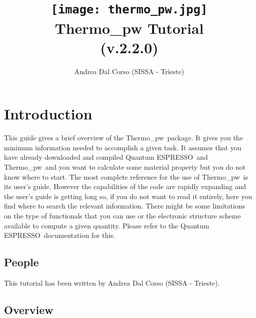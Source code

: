 \documentclass[12pt,a4paper,twoside]{report}
\def\version{2.2.0}
\def\qe{{\sc Quantum ESPRESSO}}
\def\thermo{{\sc Thermo}\_{\sc pw}}
\begin{document}
 

\author{Andrea Dal Corso (SISSA - Trieste)}
\date{}

\title{
  \texttt{[image: thermo\_pw.jpg]} \\
  \vspace{3truecm}
  \Huge \color{dark-blue} {\sc Thermo}\_{\sc pw} Tutorial \\ (v.\version)
}

\maketitle

\newpage

\tableofcontents

\newpage

{\color{dark-blue}\chapter*{Introduction}}
\color{black}

This guide gives a brief overview of the \thermo\ package. 
It gives you the minimum information needed to accomplish a given task.
It assumes that you have already downloaded and compiled \qe\ and \thermo\  
and you want to calculate some material property but you do not know where 
to start. 
The most complete reference for the use of \thermo\ is its user's guide.
However the capabilities of the code are rapidly expanding and the 
user's guide is getting long so, if you do not want
to read it entirely, here you find where to search the relevant information. 
There might be some limitations on the type of functionals that you can use 
or the electronic structure scheme available to compute a given quantity.
Please refer to the \qe\ documentation for this.

\newpage

{\color{coral}\section{People}}
\color{black}
This tutorial has been written by Andrea Dal Corso (SISSA - Trieste). 

\newpage

{\color{coral}\section{Overview}}
\color{black}
\end{document}
